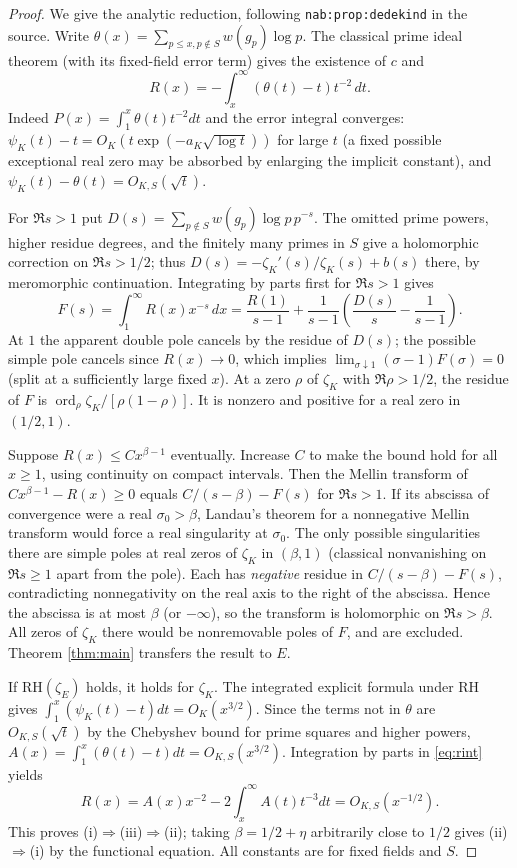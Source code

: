 \documentclass[11pt]{article}
\theoremstyle{remark}\newtheorem{remark}[theorem]{Remark}
\newcommand{\ord}{\operatorname{ord}}
\newcommand{\RH}{\mathrm{RH}}
\begin{document}
\begin{proof}
We give the analytic reduction, following \texttt{nab:prop:dedekind} in the source. Write
$\theta(x)=\sum_{p\le x,p\notin S}w(g_p)\log p$. The classical prime ideal
theorem (with its fixed-field error term) gives the existence of $c$ and
\begin{equation}\label{eq:rint}
 R(x)=-\int_x^\infty(\theta(t)-t)t^{-2}\,dt.
\end{equation}
Indeed $P(x)=\int_1^x\theta(t)t^{-2}dt$ and the error integral converges:
$\psi_K(t)-t=O_K(t\exp(-a_K\sqrt{\log t}))$ for large $t$ (a fixed possible
exceptional real zero may be absorbed by enlarging the implicit constant),
and $\psi_K(t)-\theta(t)=O_{K,S}(\sqrt t)$.

For $\Re s>1$ put $D(s)=\sum_{p\notin S}w(g_p)\log p\,p^{-s}$.
The omitted prime powers, higher residue degrees, and the finitely many primes
in $S$ give a holomorphic correction on $\Re s>1/2$; thus
$D(s)=-\zeta_K'(s)/\zeta_K(s)+b(s)$ there, by meromorphic continuation.
Integrating by parts first for $\Re s>1$ gives
\[
 F(s)=\int_1^\infty R(x)x^{-s}\,dx
 =\frac{R(1)}{s-1}+\frac{1}{s-1}\left(\frac{D(s)}s-\frac1{s-1}\right).
\]
At $1$ the apparent double pole cancels by the residue of $D(s)$; the possible
simple pole cancels since $R(x)\to0$, which implies
$\lim_{\sigma\downarrow1}(\sigma-1)F(\sigma)=0$ (split at a sufficiently large
fixed $x$). At a zero $\rho$ of $\zeta_K$ with $\Re\rho>1/2$, the residue of
$F$ is $\ord_\rho\zeta_K/[\rho(1-\rho)]$. It is nonzero and positive for a
real zero in $(1/2,1)$.

Suppose $R(x)\le Cx^{\beta-1}$ eventually. Increase $C$ to make the bound hold
for all $x\ge1$, using continuity on compact intervals. Then the Mellin transform
of $Cx^{\beta-1}-R(x)\ge0$ equals $C/(s-\beta)-F(s)$ for $\Re s>1$.
If its abscissa of convergence were a real $\sigma_0>\beta$, Landau's theorem
for a nonnegative Mellin transform would force a real singularity at $\sigma_0$.
The only possible singularities there are simple poles at real zeros of
$\zeta_K$ in $(\beta,1)$ (classical nonvanishing on $\Re s\ge1$ apart from the
pole). Each has \emph{negative} residue in $C/(s-\beta)-F(s)$, contradicting
nonnegativity on the real axis to the right of the abscissa. Hence the abscissa
is at most $\beta$ (or $-\infty$), so the transform is holomorphic on
$\Re s>\beta$. All zeros of $\zeta_K$ there would be nonremovable poles of $F$,
and are excluded. Theorem \ref{thm:main} transfers the result to $E$.

If $\RH(\zeta_E)$ holds, it holds for $\zeta_K$. The integrated explicit formula
under RH \cite{gm} gives $\int_1^x(\psi_K(t)-t)dt=O_K(x^{3/2})$.
Since the terms not in $\theta$ are $O_{K,S}(\sqrt t)$ by the Chebyshev bound
for prime squares and higher powers, $A(x)=\int_1^x(\theta(t)-t)dt=O_{K,S}(x^{3/2})$.
Integration by parts in \eqref{eq:rint} yields
\[
 R(x)=A(x)x^{-2}-2\int_x^\infty A(t)t^{-3}dt=O_{K,S}(x^{-1/2}).
\]
This proves (i)$\Rightarrow$(iii)$\Rightarrow$(ii); taking
$\beta=1/2+\eta$ arbitrarily close to $1/2$ gives (ii)$\Rightarrow$(i)
by the functional equation. All constants are for fixed fields and $S$.
\end{proof}
\end{document}
